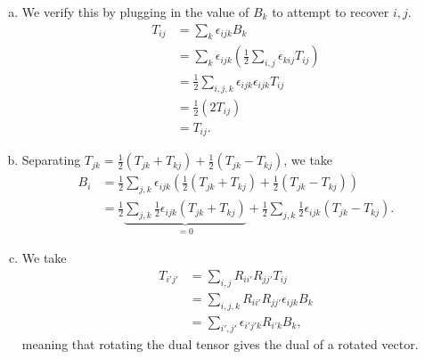 \documentclass[10pt]{mypackage}
\begin{document}
\begin{solution}[29.25]\hfill
  \begin{enumerate}[(a)]
    \item We verify this by plugging in the value of $B_k$ to attempt to recover $i,j$.
      \begin{align*}
        T_{ij} &= \sum_{k}\epsilon_{ijk}B_k\\
               &= \sum_{k}\epsilon_{ijk}\left( \frac{1}{2}\sum_{i,j}\epsilon_{kij}T_{ij} \right)\\
               &= \frac{1}{2}\sum_{i,j,k}\epsilon_{ijk}\epsilon_{ijk}T_{ij}\\
               &= \frac{1}{2}\left( 2T_{ij} \right)\\
               &= T_{ij}.
      \end{align*}
    \item Separating $T_{jk} = \frac{1}{2}\left( T_{jk} + T_{kj} \right) + \frac{1}{2}\left( T_{jk} - T_{kj} \right)$, we take
      \begin{align*}
        B_i &= \frac{1}{2}\sum_{j,k} \epsilon_{ijk} \left( \frac{1}{2}\left( T_{jk} + T_{kj} \right) + \frac{1}{2}\left( T_{jk} - T_{kj} \right) \right)\\
            &= \frac{1}{2}\underbrace{\sum_{j,k}\frac{1}{2}\epsilon_{ijk}\left( T_{jk}  + T_{kj} \right) }_{=0}+ \frac{1}{2}\sum_{j,k}\frac{1}{2}\epsilon_{ijk}\left( T_{jk} - T_{kj} \right).
      \end{align*}
    \item We take
      \begin{align*}
        T_{i'j'} &= \sum_{i,j}R_{ii'}R_{jj'}T_{ij}\\
                 &= \sum_{i,j,k}R_{ii'}R_{jj'}\epsilon_{ijk}B_{k}\\
                 &= \sum_{i',j'}\epsilon_{i' j' k}R_{i'k}B_k,
      \end{align*}
      meaning that rotating the dual tensor gives the dual of a rotated vector.
  \end{enumerate}
\end{solution}
\end{document}
